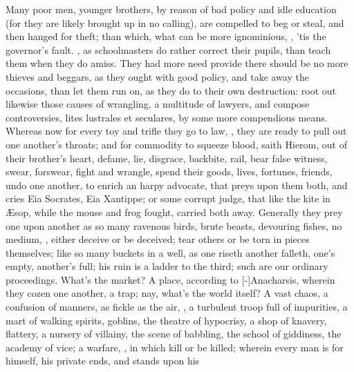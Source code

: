 {Many poor men, younger brothers, \etc{} by reason of bad policy and
idle education (for they are likely brought up in no calling), are
compelled to beg or steal, and then hanged for theft; than which, what
can be more ignominious, , 'tis the governor's fault. , as schoolmasters do rather correct their pupils,
than teach them when they do amiss. They had more need provide
there should be no more thieves and beggars, as they ought with good
policy, and take away the occasions, than let them run on, as they do
to their own destruction: root out likewise those causes of wrangling,
a multitude of lawyers, and compose controversies, lites lustrales et
seculares, by some more compendious means. Whereas now for every toy
and trifle they go to law, , they are ready to pull out one another's
throats; and for commodity to squeeze blood, saith Hierom, out of
their brother's heart, defame, lie, disgrace, backbite, rail, bear
false witness, swear, forswear, fight and wrangle, spend their goods,
lives, fortunes, friends, undo one another, to enrich an harpy
advocate, that preys upon them both, and cries Eia Socrates, Eia
Xantippe; or some corrupt judge, that like the kite in \AE{}sop,
while the mouse and frog fought, carried both away. Generally they prey
one upon another as so many ravenous birds, brute beasts, devouring
fishes, no medium, , either deceive or be
deceived; tear others or be torn in pieces themselves; like so many
buckets in a well, as one riseth another falleth, one's empty,
another's full; his ruin is a ladder to the third; such are our
ordinary proceedings. What's the market? A place, according to
[-\baselineskip]Anacharsis, wherein they cozen one another, a trap; nay, what's
the world itself? A vast chaos, a confusion of manners, as fickle
as the air, , a turbulent troop full of impurities,
a mart of walking spirits, goblins, the theatre of hypocrisy, a shop of
knavery, flattery, a nursery of villainy, the scene of babbling, the
school of giddiness, the academy of vice; a warfare, , in which kill or be killed;
wherein every man is for himself, his private ends, and stands upon his
}
